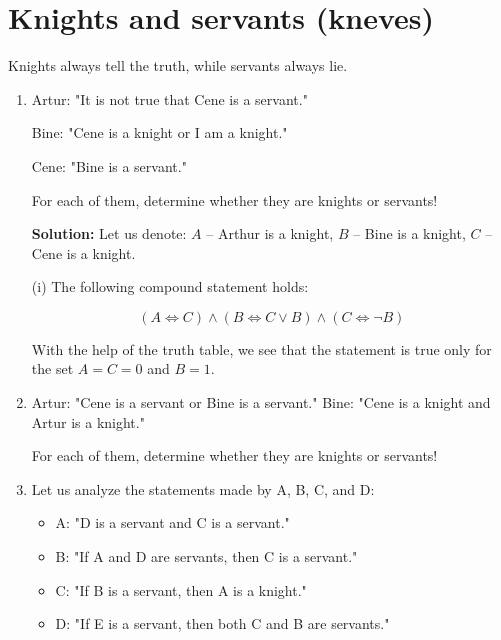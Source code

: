 \documentclass[11pt,paper=b5,footinclude,headinclude]{scrbook} %
\theoremstyle{remark}
\theoremstyle{definition} %
\theoremstyle{theorem} %
\begin{document}
\section{Knights and servants (kneves)}
Knights always tell the truth, while servants always lie.


\begin{enumerate}[resume, label=\textbf{Problem \arabic*.}]

\item 
 Artur: "It is not true that Cene is a servant."
 
Bine: "Cene is a knight or I am a knight."

Cene: "Bine is a servant."

For each of them, determine whether they are knights or servants!

\textbf{Solution:}
Let us denote: $A$ – Arthur is a knight, $B$ – Bine is a knight, $C$ – Cene is a knight.

(i) The following compound statement holds:

\[
(A \iff C) \land (B \iff C \lor B) \land (C \iff \neg B)
\]

With the help of the truth table, we see that the statement is true only for the set $A = C = 0$ and  $B = 1$. 

\item Artur: "Cene is a servant or Bine is a servant."
Bine: "Cene is a knight and Artur is a knight."

For each of them, determine whether they are knights or servants!





    \item Let us analyze the statements made by A, B, C, and D:

\begin{itemize}
    \item A: "D is a servant and C is a servant."
    \item B: "If A and D are servants, then C is a servant."
    \item C: "If B is a servant, then A is a knight."
    \item D: "If E is a servant, then both C and B are servants."
\end{itemize}


\end{enumerate}
\end{document}
